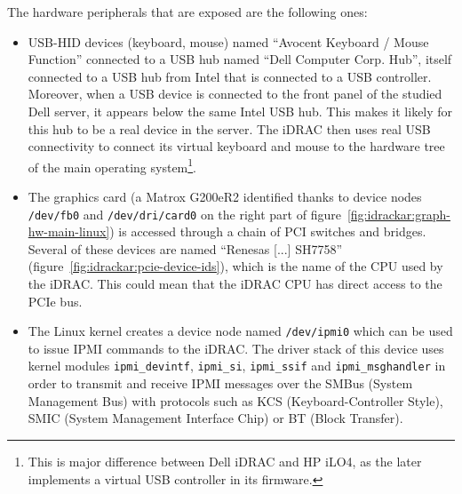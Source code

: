The hardware peripherals that are exposed are the following ones:
\begin{itemize}
  \item USB-HID devices (keyboard, mouse) named ``Avocent Keyboard / Mouse Function'' connected to a USB hub named ``Dell Computer Corp. Hub'', itself connected to a USB hub from Intel that is connected to a USB controller.
    Moreover, when a USB device is connected to the front panel of the studied Dell server, it appears below the same Intel USB hub.
    This makes it likely for this hub to be a real device in the server.
    The iDRAC then uses real USB connectivity to connect its virtual keyboard and mouse to the hardware tree of the main operating system\footnote{This is major difference between Dell iDRAC and HP iLO4, as the later implements a virtual USB controller in its firmware.}.
  \item The graphics card (a Matrox G200eR2 identified thanks to device nodes \texttt{/dev/fb0} and \texttt{/dev/dri/card0} on the right part of figure~\ref{fig:idrackar:graph-hw-main-linux}) is accessed through a chain of PCI switches and bridges.
    Several of these devices are named ``Renesas [...] SH7758'' (figure~\ref{fig:idrackar:pcie-device-ids}), which is the name of the CPU used by the iDRAC.
    This could mean that the iDRAC CPU has direct access to the PCIe bus.

  \item The Linux kernel creates a device node named \texttt{/dev/ipmi0} which can be used to issue IPMI commands to the iDRAC.
    The driver stack of this device uses kernel modules \texttt{ipmi\_devintf}, \texttt{ipmi\_si}, \texttt{ipmi\_ssif} and \texttt{ipmi\_msghandler} in order to transmit and receive IPMI messages over the SMBus (System Management Bus) with protocols such as KCS (Keyboard-Controller Style), SMIC (System Management Interface Chip) or BT (Block Transfer).
\end{itemize}

